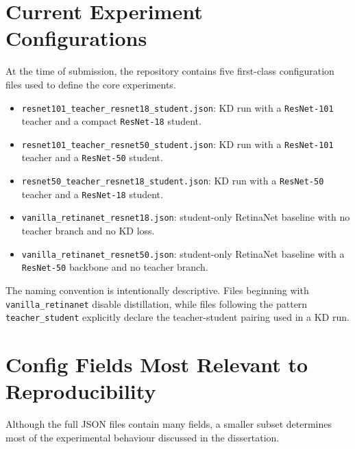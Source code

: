 \section{Current Experiment Configurations}

At the time of submission, the repository contains five first-class configuration files used to define the core experiments.

\begin{itemize}
    \item \texttt{resnet101\_teacher\_resnet18\_student.json}: KD run with a \texttt{ResNet-101} teacher and a compact \texttt{ResNet-18} student.
    \item \texttt{resnet101\_teacher\_resnet50\_student.json}: KD run with a \texttt{ResNet-101} teacher and a \texttt{ResNet-50} student.
    \item \texttt{resnet50\_teacher\_resnet18\_student.json}: KD run with a \texttt{ResNet-50} teacher and a \texttt{ResNet-18} student.
    \item \texttt{vanilla\_retinanet\_resnet18.json}: student-only RetinaNet baseline with no teacher branch and no KD loss.
    \item \texttt{vanilla\_retinanet\_resnet50.json}: student-only RetinaNet baseline with a \texttt{ResNet-50} backbone and no teacher branch.
\end{itemize}

The naming convention is intentionally descriptive. Files beginning with \texttt{vanilla\_retinanet} disable distillation, while files following the pattern \texttt{teacher\_student} explicitly declare the teacher-student pairing used in a KD run.

\section{Config Fields Most Relevant to Reproducibility}

Although the full JSON files contain many fields, a smaller subset determines most of the experimental behaviour discussed in the dissertation.

